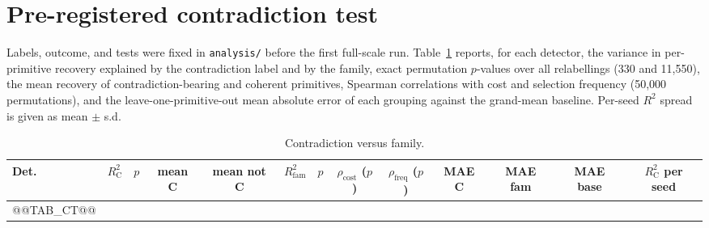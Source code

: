 \documentclass[conference]{IEEEtran}
\begin{document}
\section{Pre-registered contradiction test}
Labels, outcome, and tests were fixed in \texttt{analysis/} before the first
full-scale run. Table~\ref{tab:ct} reports, for each detector, the variance
in per-primitive recovery explained by the contradiction label and by the
family, exact permutation $p$-values over all relabellings (330 and 11,550),
the mean recovery of contradiction-bearing and coherent primitives, Spearman
correlations with cost and selection frequency (50,000 permutations), and the
leave-one-primitive-out mean absolute error of each grouping against the
grand-mean baseline. Per-seed $R^2$ spread is given as mean $\pm$ s.d.
\begin{table}[t]\caption{Contradiction versus family.}\label{tab:ct}\centering\scriptsize\setlength{\tabcolsep}{2.5pt}
\begin{tabular}{@{}lcccccccccccc@{}}\toprule
Det. & $R^2_{\mathrm{C}}$ & $p$ & mean C & mean not C & $R^2_{\mathrm{fam}}$ & $p$ & $\rho_{\mathrm{cost}}$ ($p$) & $\rho_{\mathrm{freq}}$ ($p$) & MAE C & MAE fam & MAE base & $R^2_{\mathrm{C}}$ per seed \\\midrule
@@TAB_CT@@
\bottomrule\end{tabular}\end{table}
\end{document}
